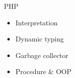 \begin{frame}{PHP}
  \begin{center}
    \begin{itemize}
      \item Interpretation
      \item Dynamic typing
      \item Garbage collector
      \item Procedure \& OOP
    \end{itemize}
  \end{center}
\end{frame}